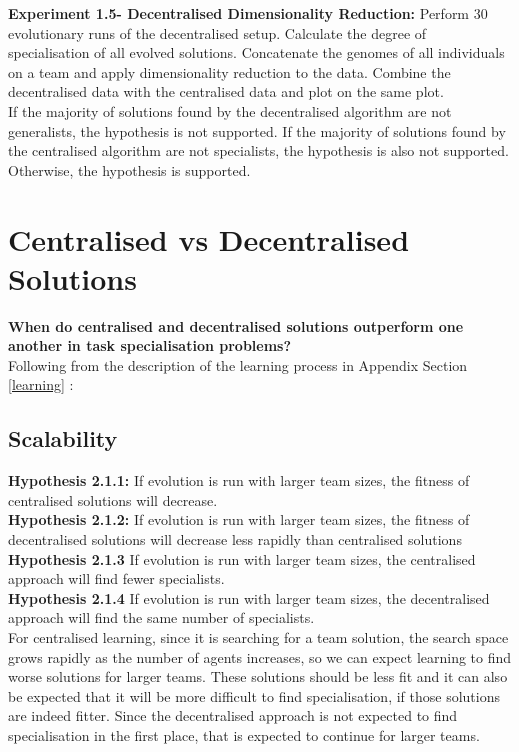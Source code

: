 \documentclass[12pt]{article}
\begin{document}
\textbf{Experiment 1.5- Decentralised Dimensionality Reduction:} Perform 30 evolutionary runs of the decentralised setup.
Calculate the degree of specialisation of all evolved solutions.
Concatenate the genomes of all individuals on a team and apply dimensionality reduction to the data.
Combine the decentralised data with the centralised data and plot on the same plot.\\

If the majority of solutions found by the decentralised algorithm are not generalists, the hypothesis is not supported.
If the majority of solutions found by the centralised algorithm are not specialists, the hypothesis is also not supported.
Otherwise, the hypothesis is supported.

\section{Centralised vs Decentralised Solutions}\label{centralised_vs_decentralised}

\textbf{When do centralised and decentralised solutions outperform one another in task specialisation problems?}\\

Following from the description of the learning process in Appendix Section \ref{learning} :\\

\subsection{Scalability}

\textbf{Hypothesis 2.1.1:} If evolution is run with larger team sizes, the fitness of centralised solutions will decrease.\\

\textbf{Hypothesis 2.1.2:} If evolution is run with larger team sizes, the fitness of decentralised solutions will decrease less rapidly than centralised solutions\\

\textbf{Hypothesis 2.1.3} If evolution is run with larger team sizes, the centralised approach will find fewer specialists.\\

\textbf{Hypothesis 2.1.4} If evolution is run with larger team sizes, the decentralised approach will find the same number of specialists.\\

For centralised learning, since it is searching for a team solution, the search space grows rapidly as the number of agents increases, so we can expect learning to find worse solutions for larger teams. 
These solutions should be less fit and it can also be expected that it will be more difficult to find specialisation, if those solutions are indeed fitter.
Since the decentralised approach is not expected to find specialisation in the first place, that is expected to continue for larger teams.\\
\end{document}
